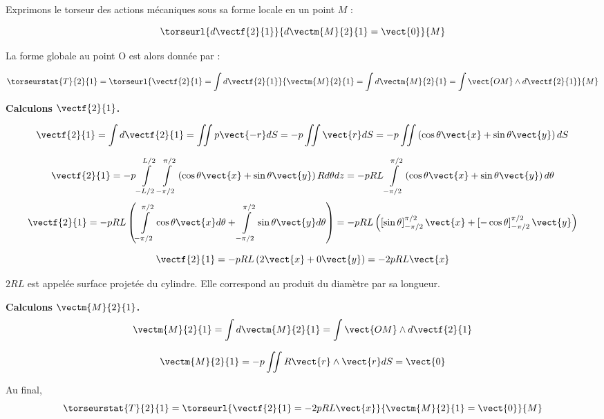 \ifprof
\begin{corrige}
Exprimons le torseur des actions mécaniques sous sa forme locale en un point $M$ : 

$$
\torseurl{d\vectf{2}{1}}{d\vectm{M}{2}{1}=\vect{0}}{M}
$$

La forme globale au point O est alors donnée par :

$$
\torseurstat{T}{2}{1} = \torseurl{\vectf{2}{1} = \int d\vectf{2}{1}}{\vectm{M}{2}{1} = \int d\vectm{M}{2}{1}= \int \vect{OM}\wedge d\vectf{2}{1}}{M}
$$




\textbf{Calculons $\vectf{2}{1}$.}

$$
\vectf{2}{1} = \int d\vectf{2}{1} = \iint p \vect{-r} dS = -p \iint  \vect{r} dS
= -p \iint  \left(\cos\theta\vect{x}+\sin\theta\vect{y} \right) dS $$

$$
\vectf{2}{1}
= -p \int\limits_{-L/2}^{L/2} \int\limits_{-\pi/2}^{\pi/2}   \left(\cos\theta\vect{x}+\sin\theta\vect{y} \right) Rd\theta dz
= -p R L \int\limits_{-\pi/2}^{\pi/2}   \left(\cos\theta\vect{x}+\sin\theta\vect{y} \right) d\theta 
$$
$$
\vectf{2}{1}
= -p R L \left(\int\limits_{-\pi/2}^{\pi/2}   \cos\theta\vect{x}d\theta + \int\limits_{-\pi/2}^{\pi/2} \sin\theta\vect{y} d\theta \right)
= -p R L \left(\left[\sin\theta \right]_{-\pi/2}^{\pi/2}\vect{x}
+\left[ -\cos\theta\right]_{-\pi/2}^{\pi/2}\vect{y}
\right)
$$

$$
\vectf{2}{1}
= -p R L \left(2\vect{x}
+0\vect{y}
\right) = -2pRL\vect{x}
$$

$2RL$ est appelée surface projetée du cylindre. Elle correspond au produit du diamètre par sa longueur.

\vspace{.5cm}

\textbf{Calculons $\vectm{M}{2}{1}$.}
$$
\vectm{M}{2}{1} = \int d\vectm{M}{2}{1}= \int \vect{OM}\wedge d\vectf{2}{1}
$$

$$
\vectm{M}{2}{1} = -p \iint R\vect{r} \wedge \vect{r}dS = \vect{0}
$$

Au final, 
$$
\torseurstat{T}{2}{1} = \torseurl{\vectf{2}{1} = -2pRL\vect{x}}{\vectm{M}{2}{1} =  \vect{0}}{M}
$$

\end{corrige}
\else
\fi





